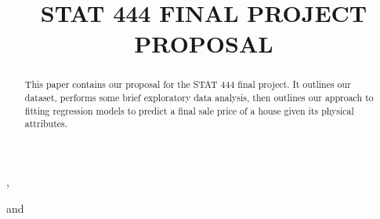 \documentclass[aoas]{imsart}
\numberwithin{equation}{section}
\theoremstyle{plain}
\theoremstyle{remark}
\begin{document}
\begin{frontmatter}
\title{STAT 444 FINAL PROJECT PROPOSAL}
\runtitle{}



\begin{aug}


\author[A]{ 
  }
  ,
\author[A]{ 
  }
  
\author[A]{ 
  }
  and
\author[A]{ 
  }
  

\address[A]{Department of Statistics and Actuarial Science, University
of Waterloo,
  }
\end{aug}

\begin{abstract}
This paper contains our proposal for the STAT 444 final project. It
outlines our dataset, performs some brief exploratory data analysis,
then outlines our approach to fitting regression models to predict a
final sale price of a house given its physical attributes.
\end{abstract}


\begin{keyword}
\end{keyword}

\end{frontmatter}
\end{document}
